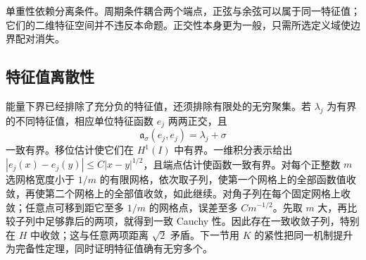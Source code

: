 单重性依赖分离条件。周期条件耦合两个端点，正弦与余弦可以属于同一特征值；它们的二维特征空间并不违反本命题。正交性本身更为一般，只需所选定义域使边界配对消失。

\subsection{特征值离散性}
\label{b2:subsec:100204}

能量下界已经排除了充分负的特征值，还须排除有限处的无穷聚集。若 \(\lambda_j\) 为有界的不同特征值，相应单位特征函数 \(e_j\) 两两正交，且
\[
 \mathfrak a_\sigma(e_j,e_j)=\lambda_j+\sigma
\]
一致有界。移位估计使它们在 \(H^1(I)\) 中有界。一维积分表示给出 \(|e_j(x)-e_j(y)|\leq C|x-y|^{1/2}\)，且端点估计使函数一致有界。对每个正整数 \(m\) 选网格宽度小于 \(1/m\) 的有限网格，依次取子列，使第一个网格上的全部函数值收敛，再使第二个网格上的全部值收敛，如此继续。对角子列在每个固定网格上收敛；任意点可移到距它至多 \(1/m\) 的网格点，误差至多 \(Cm^{-1/2}\)。先取 \(m\) 大，再比较子列中足够靠后的两项，就得到一致 Cauchy 性。因此存在一致收敛子列，特别在 \(H\) 中收敛；这与任意两项距离 \(\sqrt2\) 矛盾。下一节用 \(K\) 的紧性把同一机制提升为完备性定理，同时证明特征值确有无穷多个。
